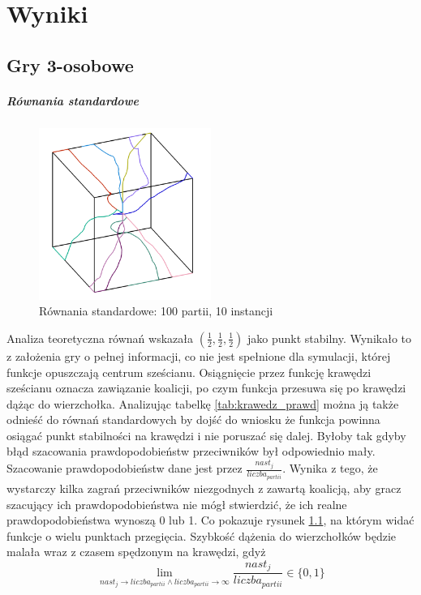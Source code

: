 \chapter{Wyniki}
\label{cha:wyniki}

\section{Gry 3-osobowe}
\label{sec:N3nzal}

\paragraph{Równania standardowe}
\label{sec:r_stan}
\begin{figure}
    \centering
    \includegraphics[width=0.5\textwidth]{pict/wyniki/stand100_10.png}   
    \caption{Równania standardowe: 100 partii, 10 instancji}
	\label{fig:stand100_10} 
\end{figure}

Analiza teoretyczna równań wskazała $(\frac{1}{2},\frac{1}{2},\frac{1}{2})$ jako punkt stabilny. Wynikało to z założenia gry o pełnej informacji, co nie jest spełnione dla symulacji, której funkcje opuszczają centrum sześcianu. Osiągnięcie przez funkcję krawędzi sześcianu oznacza zawiązanie koalicji, po czym funkcja przesuwa się po krawędzi dążąc do wierzchołka. Analizując tabelkę \ref{tab:krawedz_prawd} można ją także odnieść do równań standardowych by dojść do wniosku że funkcja powinna osiągać punkt stabilności na krawędzi i nie poruszać się dalej. Byłoby tak gdyby błąd szacowania prawdopodobieństw przeciwników był odpowiednio mały. Szacowanie prawdopodobieństw dane jest przez $\frac{nast_{j}}{liczba_{partii}}$. Wynika z tego, że wystarczy kilka zagrań przeciwników niezgodnych z zawartą koalicją, aby gracz szacujący ich prawdopodobieństwa nie mógł stwierdzić, że ich realne prawdopodobieństwa wynoszą 0 lub 1. Co pokazuje rysunek \ref{fig:stand100_10}, na którym widać funkcje o wielu punktach przegięcia. Szybkość dążenia do wierzchołków będzie malała wraz z czasem spędzonym na krawędzi, gdyż 
\[\lim_{nast_j\rightarrow liczba_{partii} \wedge liczba_{partii} \rightarrow \infty} \frac{nast_j}{liczba_{partii}} \in \{0,1\} \]

